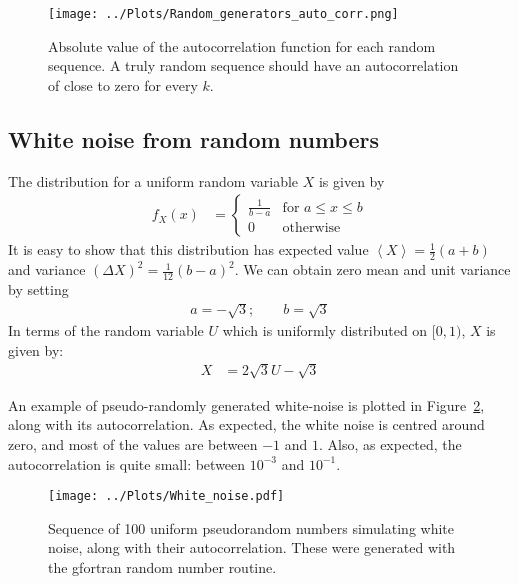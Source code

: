 \documentclass[twocolumn]{myarticle}
\begin{document}
\begin{figure}[ht!]
    \begin{center}
    \texttt{[image: ../Plots/Random\_generators\_auto\_corr.png]}
    \caption{%
        Absolute value of the autocorrelation function for each random sequence.
        A truly random sequence should have an autocorrelation of close to zero for every $ k $.
    }
    \label{fig:random_generators_auto_corr}
    \end{center}
\end{figure}

\subsection{White noise from random numbers}
\label{subsec:white_noise_from_random_numbers}

The distribution for a uniform random variable $ X $ is given by
\begin{align}
    f_X(x) &= \begin{cases} \frac{1}{b-a} & \text{for } a \leq x \leq b \\ 0 & \text{otherwise} \end{cases}
\end{align}
It is easy to show that this distribution has expected value $ \left\langle X \right\rangle = \frac{1}{2} (a+b) $ and variance $ (\Delta X)^2 = \frac{1}{12} (b-a)^2 $.
We can obtain zero mean and unit variance by setting
\begin{align}
    a = -\sqrt{3} ; \qquad b = \sqrt{3}
\end{align}
In terms of the random variable $ U $ which is uniformly distributed on $ [0, 1) $, $ X $ is given by:
\begin{align}
    X &= 2 \sqrt{3} U - \sqrt{3}
\end{align}

An example of pseudo-randomly generated white-noise is plotted in Figure~\ref{fig:white_noise}, along with its autocorrelation.
As expected, the white noise is centred around zero, and most of the values are between $ -1 $ and $ 1 $.
Also, as expected, the autocorrelation is quite small: between $ 10^{-3} $ and $ 10^{-1} $.

\begin{figure}[ht!]
    \begin{center}
    \texttt{[image: ../Plots/White\_noise.pdf]}
    \caption{%
        Sequence of 100 uniform pseudorandom numbers simulating white noise, along with their autocorrelation.
        These were generated with the gfortran random number routine.
    }
    \label{fig:white_noise}
    \end{center}
\end{figure}
\end{document}
